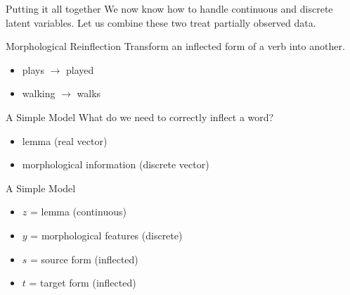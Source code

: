 \documentclass[14pt, aspectratio=169]{beamer}
\begin{document}
\begin{frame}{Putting it all together}
We now know how to handle continuous and discrete latent variables. Let us combine these two treat partially observed data.
\pause
\begin{block}{Morphological Reinflection}
Transform an inflected form of a verb into another.
\begin{itemize}
\pause
\item plays $ \rightarrow $ played
\pause
\item walking $ \rightarrow $ walks
\end{itemize}
\end{block}
\end{frame}

\begin{frame}{A Simple Model \citep{ZhouNeubig:2017}}
What do we need to correctly inflect a word?
\pause
\begin{itemize}
\item lemma \pause (real vector)
\pause
\item morphological information \pause (discrete vector)
\end{itemize}
\end{frame}

\begin{frame}{A Simple Model \citep{ZhouNeubig:2017}}
\begin{figure}
\center
{}
\end{figure}
\begin{itemize}
\item $ z $ = lemma (continuous)
\item $ y $ = morphological features (discrete)
\item $ s $ = source form (inflected)
\item $ t $ = target form (inflected)
\end{itemize}
\end{frame}
\end{document}
